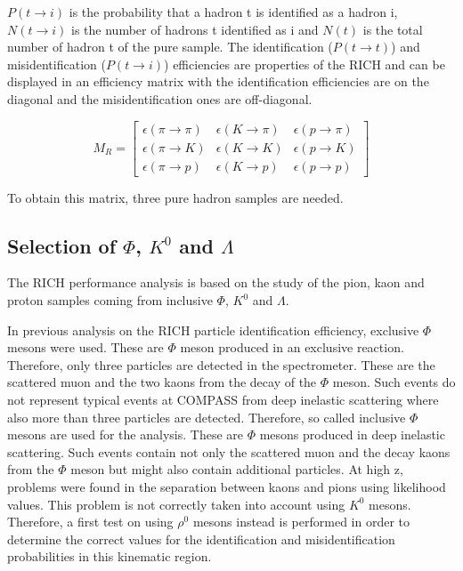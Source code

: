 $P(t \rightarrow i)$ is the probability that a hadron t is identified as a hadron i, $N(t \rightarrow i)$ is the number of hadrons t identified as i and $N(t)$ is the
total number of hadron t of the pure sample. The identification ($P(t \rightarrow t)$) and misidentification ($P(t \rightarrow i)$) efficiencies are properties of the RICH and can
be displayed in an efficiency matrix with the identification efficiencies are on the diagonal and the misidentification ones are off-diagonal.

\begin{equation}
  M_R
  =
  \begin{bmatrix}
  \epsilon(\pi \rightarrow \pi) & \epsilon(K \rightarrow \pi) & \epsilon(p \rightarrow \pi)\\
  \epsilon(\pi \rightarrow K) & \epsilon(K \rightarrow K) & \epsilon(p \rightarrow K) \\
  \epsilon(\pi \rightarrow p) & \epsilon(K \rightarrow p) & \epsilon(p \rightarrow p)
  \end{bmatrix}
\end{equation}

To obtain this matrix, three pure hadron samples are needed.

\subsection{Selection of $\Phi$, $K^0$ and $\Lambda$}

The RICH performance analysis is based on the study of the pion, kaon and proton samples coming from inclusive $\Phi$, $K^0$ and $\Lambda$.

In previous analysis on the RICH particle identification efficiency, exclusive $\Phi$ mesons were used. These are $\Phi$ meson produced in an exclusive reaction.
Therefore, only three particles are detected in the spectrometer. These are the scattered muon and the two kaons from the decay of the $\Phi$ meson. Such events do not
represent typical events at COMPASS from deep inelastic scattering where also more than three particles are detected. Therefore, so called inclusive $\Phi$ mesons are
used for the analysis. These are $\Phi$ mesons produced in deep inelastic scattering. Such events contain not only the scattered muon and the decay kaons from the $\Phi$
meson but might also contain additional particles.
At high z, problems were found in the separation between kaons and pions using likelihood values\cite{}. This problem is not correctly taken into account using $K^0$ mesons.
Therefore, a first test on using $\rho^0$ mesons instead is performed in order to determine the correct values for the identification and misidentification probabilities
in this kinematic region.

